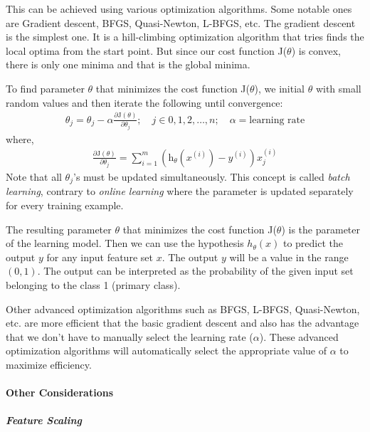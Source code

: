 This can be achieved using various optimization algorithms. Some notable
ones are Gradient descent, BFGS, Quasi-Newton, L-BFGS, etc. The gradient
descent is the simplest one. It is a hill-climbing optimization algorithm
that tries finds the local optima from the start point. But since our
cost function J($\theta$) is convex, there is only one minima and that is the
global minima.

To find parameter $\theta$ that minimizes the cost function J($\theta$),
we initial $\theta$ with small random values and then
iterate the following until convergence:
\begin{align}
  \theta_j = \theta_j - \alpha \frac{\partial \text{J}(\theta)}{\partial \theta_j};
  \quad j \in {0,1,2,\ldots,n}; \quad \alpha = \text{learning rate}
  \nonumber
\end{align}
where,
\begin{align}
  \frac{\partial \text{J}(\theta)}{\partial \theta_j} =
  \sum_{i=1}^{m} \left( \text{h}_\theta \left(x^{(i)}\right) - y^{(i)} \right) x^{(i)}_j
\end{align}
Note that all $\theta_j$'s must be updated simultaneously. This concept is called
{\em batch learning}, contrary to {\em online learning} where the parameter is updated
separately for every training example.

The resulting parameter $\theta$ that minimizes the cost function J($\theta$) is
the parameter of the learning model. Then we can use the hypothesis $h_\theta(x)$
to predict the output $y$ for any input feature set $x$. The output $y$ will be
a value in the range $(0,1)$. The output can be interpreted as the probability
of the given input set belonging to the class 1 (primary class).

Other advanced optimization algorithms such as BFGS, L-BFGS, Quasi-Newton, etc.
are more efficient that the basic gradient descent and also has the advantage that
we don't have to manually select the learning rate ($\alpha$). These advanced
optimization algorithms will automatically select the appropriate value of $\alpha$
to maximize efficiency.

\paragraph{Other Considerations}\hfill


\subparagraph{Feature Scaling}\hfill

